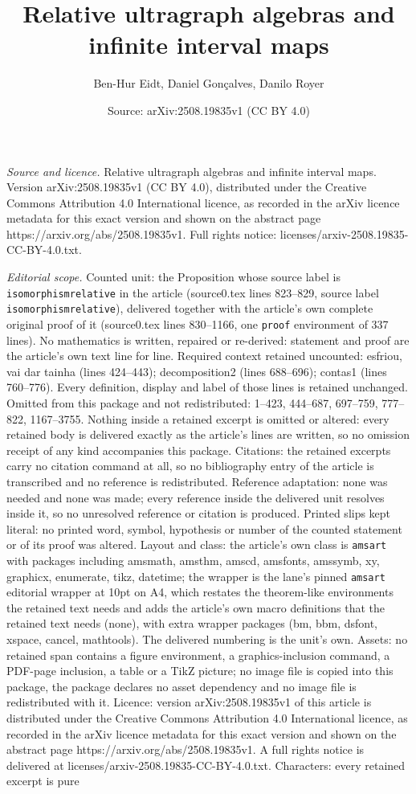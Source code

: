 \documentclass[10pt,a4paper]{amsart}
\title[Relative ultragraph algebras and infinite interval maps]{Relative ultragraph algebras and infinite interval maps}
\author{Ben-Hur Eidt, Daniel Gon\c{c}alves, Danilo Royer}
\date{Source: arXiv:2508.19835v1 (CC BY 4.0)}
\begin{document}
\maketitle

\noindent\emph{Source and licence.} Relative ultragraph algebras and infinite interval maps. Version arXiv:2508.19835v1 (CC BY 4.0), distributed under the Creative Commons Attribution 4.0 International licence, as recorded in the arXiv licence metadata for this exact version and shown on the abstract page https://arxiv.org/abs/2508.19835v1. Full rights notice: licenses/arxiv-2508.19835-CC-BY-4.0.txt.\par\smallskip

\noindent\textit{Editorial scope.} Counted unit: the Proposition whose source label is \texttt{isomorphismrelative} in the article (source0.tex lines 823--829, source label \texttt{isomorphismrelative}), delivered together with the article's own complete original proof of it (source0.tex lines 830--1166, one \texttt{proof} environment of 337 lines). No mathematics is written, repaired or re-derived: statement and proof are the article's own text line for line. Required context retained uncounted: esfriou, vai dar tainha (lines 424--443); decomposition2 (lines 688--696); contas1 (lines 760--776). Every definition, display and label of those lines is retained unchanged. Omitted from this package and not redistributed: 1--423, 444--687, 697--759, 777--822, 1167--3755. Nothing inside a retained excerpt is omitted or altered: every retained body is delivered exactly as the article's lines are written, so no omission receipt of any kind accompanies this package. Citations: the retained excerpts carry no citation command at all, so no bibliography entry of the article is transcribed and no reference is redistributed. Reference adaptation: none was needed and none was made; every reference inside the delivered unit resolves inside it, so no unresolved reference or citation is produced. Printed slips kept literal: no printed word, symbol, hypothesis or number of the counted statement or of its proof was altered. Layout and class: the article's own class is \texttt{amsart} with packages including amsmath, amsthm, amscd, amsfonts, amssymb, xy, graphicx, enumerate, tikz, datetime; the wrapper is the lane's pinned \texttt{amsart} editorial wrapper at 10pt on A4, which restates the theorem-like environments the retained text needs and adds the article's own macro definitions that the retained text needs (none), with extra wrapper packages (bm, bbm, dsfont, xspace, cancel, mathtools). The delivered numbering is the unit's own. Assets: no retained span contains a figure environment, a graphics-inclusion command, a PDF-page inclusion, a table or a TikZ picture; no image file is copied into this package, the package declares no asset dependency and no image file is redistributed with it. Licence: version arXiv:2508.19835v1 of this article is distributed under the Creative Commons Attribution 4.0 International licence, as recorded in the arXiv licence metadata for this exact version and shown on the abstract page https://arxiv.org/abs/2508.19835v1. A full rights notice is delivered at licenses/arxiv-2508.19835-CC-BY-4.0.txt. Characters: every retained excerpt is pure 
\end{document}
